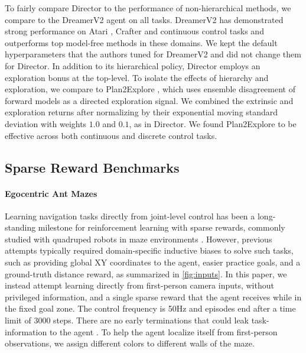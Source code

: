 To fairly compare Director to the performance of non-hierarchical methods, we compare to the DreamerV2 agent on all tasks. 
DreamerV2 has demonstrated strong performance on Atari \citep{hafner2020dreamerv2}, Crafter \citep{hafner2021crafter} and continuous control tasks \citep{yarats2021drqv2} and outperforms top model-free methods in these domains. 
We kept the default hyperparameters that the authors tuned for DreamerV2 and did not change them for Director. 
In addition to its hierarchical policy, Director employs an exploration bonus at the top-level. 
To isolate the effects of hierarchy and exploration, we compare to Plan2Explore \citep{sekar2020plan2explore}, which uses ensemble disagreement of forward models as a directed exploration signal. 
We combined the extrinsic and exploration returns after normalizing by their exponential moving standard deviation with weights $1.0$ and $0.1$, as in Director. 
We found Plan2Explore to be effective across both continuous and discrete control tasks.

\subsection{Sparse Reward Benchmarks}
\label{sec:sparse}

\paragraph{Egocentric Ant Mazes}

Learning navigation tasks directly from joint-level control has been a long-standing milestone for reinforcement learning with sparse rewards, commonly studied with quadruped robots in maze environments \citep{florensa2017snn,nachum2018hiro}. 
However, previous attempts typically required domain-specific inductive biases to solve such tasks, such as providing global XY coordinates to the agent, easier practice goals, and a ground-truth distance reward, as summarized in \cref{fig:inputs}. 
In this paper, we instead attempt learning directly from first-person camera inputs, without privileged information, and a single sparse reward that the agent receives while in the fixed goal zone. 
The control frequency is 50Hz and episodes end after a time limit of 3000 steps. 
There are no early terminations that could leak task-information to the agent \citep{laskin2022cic}. 
To help the agent localize itself from first-person observations, we assign different colors to different walls of the maze.

